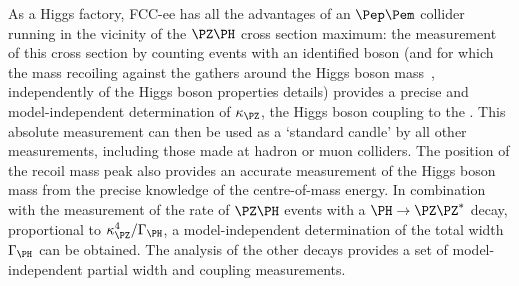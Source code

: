 As a Higgs factory, FCC-ee has all the advantages of an $\Pep\Pem$ collider running in the vicinity of the $\PZ\PH$ cross section maximum: the measurement of this cross section by counting events with an identified \PZ boson 
(and for which the mass recoiling against the \PZ gathers around the Higgs boson mass~\cite{Azzurri:2021nmy}, independently of the Higgs boson properties details) 
provides a precise and model-independent determination of $\kappa_{\PZ}$, the Higgs boson coupling to the \PZ. 
This absolute measurement can then be used as a `standard candle' by all other measurements, including those made at hadron or muon colliders. 
The position of the \PZ recoil mass peak also provides an accurate measurement of the Higgs boson mass from the precise knowledge of the centre-of-mass energy. 
In combination with the measurement of the rate of $\PZ\PH$ events with a $\PH \to \PZ \PZ^\ast$ decay, proportional to $\kappa_{\PZ}^4/\Gamma_{\PH}$, a model-independent determination of the total width $\Gamma_{\PH}$ can be obtained. 
The analysis of the other decays provides a set of model-independent partial width and coupling measurements. 

